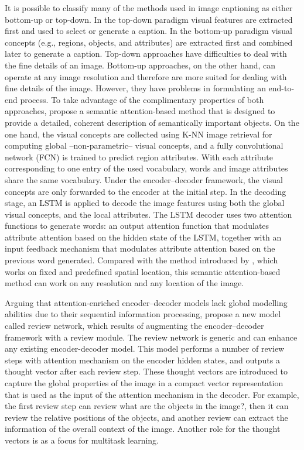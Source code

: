 It is possible to classify many of the methods used in image captioning as either bottom-up or top-down. In the top-down paradigm \citep{Donahue2015, Karpathy2015, Chen2015, Mao2015a, Mao2015b, Vinyals2015,Xu2015} visual features are extracted first and used to select or generate a caption. In the bottom-up paradigm \citep{Farhadi2010, Kulkarni2011, Li2011, Kuznetsova2012, Elliott2013, Lebret2015a} visual concepts (e.g., regions, objects, and attributes) are extracted first and combined later to generate a caption. Top-down approaches have difficulties to deal with the fine details of an image. Bottom-up approaches, on the other hand, can operate at any image resolution and therefore are more suited for dealing with  fine details of the image. However, they have problems in formulating an end-to-end process. To take advantage of the complimentary properties of both approaches, \citet{You2016} propose a semantic attention-based method that is designed to provide a detailed, coherent description of semantically important objects. On the one hand, the visual concepts are collected using K-NN image retrieval for computing global --non-parametric-- visual concepts, and a fully convolutional network (FCN) \citep{Long2015} is trained to predict region attributes. With each attribute corresponding to one entry of the used vocabulary, words and image attributes share the same vocabulary. Under the encoder–decoder framework, the visual concepts are only forwarded to the encoder at the initial step. In the decoding stage, an LSTM is applied to decode the image features using both the global visual concepts, and the local attributes. The LSTM decoder uses two attention functions to generate words: an output attention function that modulates attribute attention based on the hidden state of the LSTM, together with an input feedback mechanism that modulates attribute attention based on the previous word generated. Compared with the method introduced by \citet{Xu2015}, which works on fixed and predefined spatial location, this semantic attention-based method can work on any resolution and any location of the image.

Arguing that attention-enriched encoder–decoder models lack global modelling abilities due to their sequential information processing, \citet{Yang2016} propose a new model called review network, which results of augmenting the encoder–decoder framework with a review module. The review network is generic and can enhance any existing encoder-decoder model.
This model performs a number of review steps with attention mechanism on the encoder hidden states, and outputs a thought vector after each review step. These thought vectors are introduced to capture the global properties of the image in a compact vector representation that is used as the input of the attention mechanism in the decoder. For example, the first review step can review what are the objects in the image?, then it can review the relative positions of the objects, and another review can extract the information of the overall context of the image. Another role for the thought vectors is as a focus for multitask learning.

